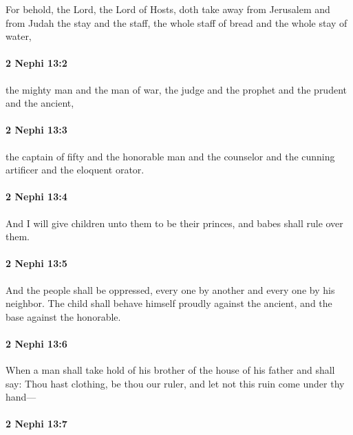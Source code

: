 			For behold, the Lord, the Lord of Hosts, doth take away
			from Jerusalem and from Judah
			the stay and the staff,
			the whole staff of bread and the whole stay of water,

		\paragraph{2 Nephi 13:2} %
			\label{2NEPHI-13-2}

			the mighty man and the man of war,
			the judge and the prophet and the prudent and the ancient,

		\paragraph{2 Nephi 13:3} %
			\label{2NEPHI-13-3}

			the captain of fifty and the honorable man and the counselor
			and the cunning artificer and the eloquent orator.

		\paragraph{2 Nephi 13:4} %
			\label{2NEPHI-13-4}

			And I will give children unto them to be their princes,
			and babes shall rule over them.

		\paragraph{2 Nephi 13:5} %
			\label{2NEPHI-13-5}

			And the people shall be oppressed,
			every one by another and every one by his neighbor.
			The child shall behave himself proudly against the ancient,
			and the base against the honorable.

		\paragraph{2 Nephi 13:6} %
			\label{2NEPHI-13-6}

			When a man shall take hold of his brother of the house of his father
			and shall say:
			Thou hast clothing, be thou our ruler,
			and let not this ruin come under thy hand---

		\paragraph{2 Nephi 13:7} %
			\label{2NEPHI-13-7}

